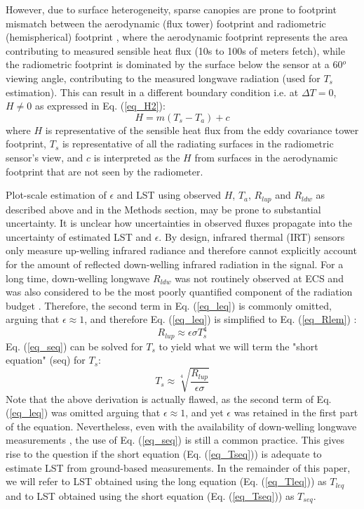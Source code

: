 \documentclass[fleqn,10pt]{wlscirep}
\begin{document}
However, due to surface heterogeneity, sparse canopies are prone to footprint mismatch between the aerodynamic (flux tower) footprint and radiometric (hemispherical) footprint \cite{chu2021representativeness,marcolla2018geometry,morillas2013using}, where the aerodynamic footprint represents the area contributing to measured sensible heat flux (10s to 100s of meters fetch), while the radiometric footprint is dominated by the surface below the sensor at a 60$^o$ viewing angle, contributing to the measured longwave radiation (used for $T_{s}$ estimation). This can result in a different boundary condition i.e. at $\Delta T =0$, $H \not= 0$ as expressed in Eq. (\ref{eq_H2}): 
\begin{equation}\label{eq_H2}
H= m(T_{s} - T_{a}) +  c    
\end{equation}
where $H$ is representative of the sensible heat flux from the eddy covariance tower footprint, $T_{s}$ is representative of all the radiating surfaces in the radiometric sensor’s view, and $c$ is interpreted as the $H$ from surfaces in the aerodynamic footprint that are not seen by the radiometer. 

Plot-scale estimation of $\epsilon$ and LST using observed $H$, $T_{a}$, $R_{lup}$ and $R_{ldw}$ as described above and in the Methods section, may be prone to substantial uncertainty. It is unclear how uncertainties in observed fluxes propagate into the uncertainty of estimated LST and $\epsilon$. By design, infrared thermal (IRT) sensors only measure up-welling infrared radiance and therefore cannot explicitly account for the amount of reflected down-welling infrared radiation in the signal. For a long time, down-welling longwave $R_{ldw}$ was not routinely observed at ECS \cite{wang2009evaluation} and was also considered to be the most poorly quantified component of the radiation budget \cite{trenberth2012tracking}. Therefore, the second term in Eq. (\ref{eq_leq}) is commonly omitted, arguing that $\epsilon\approx 1$, and therefore Eq. (\ref{eq_leq}) is simplified to Eq. (\ref{eq_Rlem}) \cite{crago2014use}:
\begin{equation}\label{eq_seq}
R_{lup} \approx \epsilon \sigma T_{s}^{4}
\end{equation} 
Eq. (\ref{eq_seq}) can be solved for $T_s$ to yield what we will term the "short equation" (seq) for $T_s$:
\begin{equation}\label{eq_Tseq}
T_{s} \approx \sqrt[4]{\frac{R_{lup}}{\epsilon \sigma}}
\end{equation} 
Note that the above derivation is actually flawed, as the second term of Eq. (\ref{eq_leq}) was omitted arguing that $\epsilon\approx 1$, and yet $\epsilon$ was retained in the first part of the equation. Nevertheless, even with the availability of down-welling longwave measurements \cite{stephens1995review}, the use of Eq. (\ref{eq_seq}) is still a common practice\cite{crago2014use,mallick2018bridging}. This gives rise to the question if the short equation (Eq. (\ref{eq_Tseq})) is adequate to estimate LST from ground-based measurements. In the remainder of this paper, we will refer to LST obtained using the long equation (Eq. (\ref{eq_Tleq})) as $T_{leq}$ and to LST obtained using the short equation (Eq. (\ref{eq_Tseq})) as $T_{seq}$.
\end{document}
